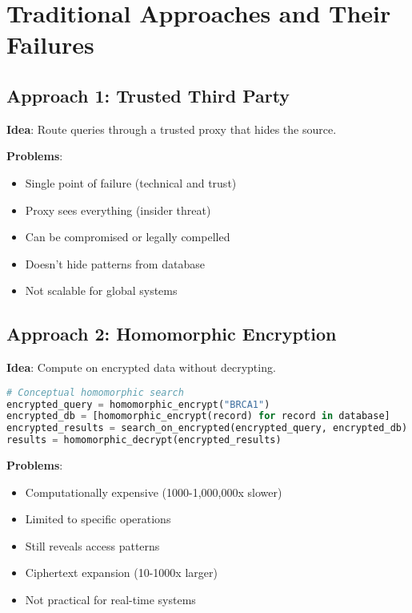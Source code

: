 \section{Traditional Approaches and Their Failures}

\subsection{Approach 1: Trusted Third Party}

\textbf{Idea}: Route queries through a trusted proxy that hides the source.

\textbf{Problems}:
\begin{itemize}
\item Single point of failure (technical and trust)
\item Proxy sees everything (insider threat)
\item Can be compromised or legally compelled
\item Doesn't hide patterns from database
\item Not scalable for global systems
\end{itemize}

\subsection{Approach 2: Homomorphic Encryption}

\textbf{Idea}: Compute on encrypted data without decrypting.

\begin{lstlisting}[language=Python, caption={Conceptual homomorphic search}]
# Conceptual homomorphic search
encrypted_query = homomorphic_encrypt("BRCA1")
encrypted_db = [homomorphic_encrypt(record) for record in database]
encrypted_results = search_on_encrypted(encrypted_query, encrypted_db)
results = homomorphic_decrypt(encrypted_results)
\end{lstlisting}

\textbf{Problems}:
\begin{itemize}
\item Computationally expensive (1000-1,000,000x slower)
\item Limited to specific operations
\item Still reveals access patterns
\item Ciphertext expansion (10-1000x larger)
\item Not practical for real-time systems
\end{itemize}

